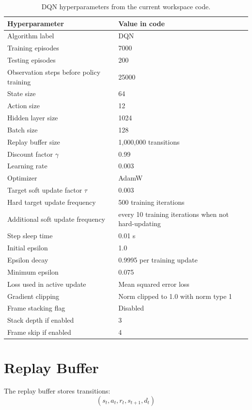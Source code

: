 \documentclass[11pt,a4paper]{article}
\begin{document}
\begin{table}[h]
\centering
\begin{tabular}{ll}
\toprule
\textbf{Hyperparameter} & \textbf{Value in code} \\
\midrule
Algorithm label & DQN \\
Training episodes & 7000 \\
Testing episodes & 200 \\
Observation steps before policy training & 25000 \\
State size & 64 \\
Action size & 12 \\
Hidden layer size & 1024 \\
Batch size & 128 \\
Replay buffer size & 1,000,000 transitions \\
Discount factor $\gamma$ & 0.99 \\
Learning rate & 0.003 \\
Optimizer & AdamW \\
Target soft update factor $\tau$ & 0.003 \\
Hard target update frequency & 500 training iterations \\
Additional soft update frequency & every 10 training iterations when not hard-updating \\
Step sleep time & 0.01 s \\
Initial epsilon & 1.0 \\
Epsilon decay & 0.9995 per training update \\
Minimum epsilon & 0.075 \\
Loss used in active update & Mean squared error loss \\
Gradient clipping & Norm clipped to 1.0 with norm type 1 \\
Frame stacking flag & Disabled \\
Stack depth if enabled & 3 \\
Frame skip if enabled & 4 \\
\bottomrule
\end{tabular}
\caption{DQN hyperparameters from the current workspace code.}
\end{table}

\section{Replay Buffer}

The replay buffer stores transitions:
\[
    (s_t, a_t, r_t, s_{t+1}, d_t)
\]
\end{document}
